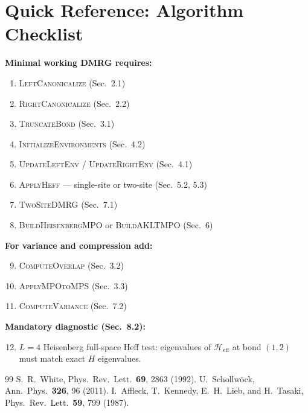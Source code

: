 \documentclass[aps,prb,onecolumn,scriptaddress]{revtex4-2}
\begin{document}
\section{Quick Reference: Algorithm Checklist}

\textbf{Minimal working DMRG requires:}
\begin{enumerate}
\item \textsc{LeftCanonicalize} (Sec.~2.1)
\item \textsc{RightCanonicalize} (Sec.~2.2)
\item \textsc{TruncateBond} (Sec.~3.1)
\item \textsc{InitializeEnvironments} (Sec.~4.2)
\item \textsc{UpdateLeftEnv} / \textsc{UpdateRightEnv} (Sec.~4.1)
\item \textsc{ApplyHeff} --- single-site or two-site (Sec.~5.2, 5.3)
\item \textsc{TwoSiteDMRG} (Sec.~7.1)
\item \textsc{BuildHeisenbergMPO} or \textsc{BuildAKLTMPO} (Sec.~6)
\end{enumerate}

\textbf{For variance and compression add:}
\begin{enumerate}
\setcounter{enumi}{8}
\item \textsc{ComputeOverlap} (Sec.~3.2)
\item \textsc{ApplyMPOtoMPS} (Sec.~3.3)
\item \textsc{ComputeVariance} (Sec.~7.2)
\end{enumerate}

\textbf{Mandatory diagnostic (Sec.~8.2):}
\begin{enumerate}
\setcounter{enumi}{11}
\item $L=4$ Heisenberg full-space Heff test: eigenvalues of $\mathcal{H}_{\text{eff}}$ at bond $(1,2)$ must match exact $H$ eigenvalues.
\end{enumerate}

\begin{thebibliography}{99}
 S.~R.~White, Phys.\ Rev.\ Lett.\ \textbf{69}, 2863 (1992).
 U.~Schollw\"ock, Ann.\ Phys.\ \textbf{326}, 96 (2011).
 I.~Affleck, T.~Kennedy, E.~H.~Lieb, and H.~Tasaki, Phys.\ Rev.\ Lett.\ \textbf{59}, 799 (1987).
\end{thebibliography}
\end{document}
